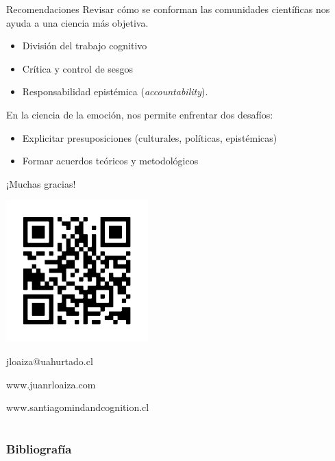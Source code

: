 \documentclass[%
            9pt,
                spanish, %
                    ignorenonframetext,
                aspectratio=169, %
        ]{beamer}
\providecommand{\tightlist}{}
\begin{document}
\begin{frame}{Recomendaciones}
\label{recomendaciones-2}
Revisar cómo se conforman las comunidades científicas nos ayuda a una
ciencia más objetiva.

\begin{itemize}
\tightlist
\item
  División del trabajo cognitivo
\item
  Crítica y control de sesgos
\item
  Responsabilidad epistémica (\emph{accountability}).
\end{itemize}

En la ciencia de la emoción, nos permite enfrentar dos desafíos:

\begin{itemize}
\tightlist
\item
  Explicitar presuposiciones (culturales, políticas, epistémicas)
\item
  Formar acuerdos teóricos y metodológicos
\end{itemize}
\end{frame}



\begin{frame}

    \centering
    {\Large
    ¡Muchas gracias!}

      \includegraphics{qr_juanrloaizacom.pdf}

    jloaiza@uahurtado.cl

    www.juanrloaiza.com

    www.santiagomindandcognition.cl

\end{frame}

\section{}
\begin{frame}[allowframebreaks]
\frametitle{Bibliografía}
\printbibliography
\end{frame}
\end{document}
